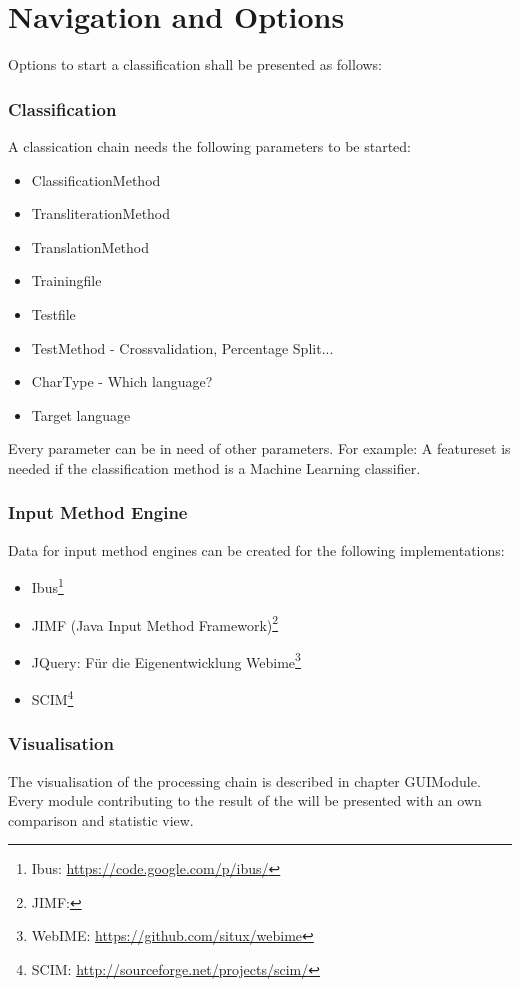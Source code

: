 \documentclass[10pt,a4paper,titlepage]{report}
\begin{document}
	\section{Navigation and Options}
	Options to start a classification shall be presented as follows:
	\subsubsection{Classification}
	A classication chain needs the following parameters to be started:
	\begin{itemize}
		\item ClassificationMethod
		\item TransliterationMethod
		\item TranslationMethod
		\item Trainingfile
		\item Testfile
		\item TestMethod - Crossvalidation, Percentage Split...
		\item CharType - Which language?
		\item Target language
	\end{itemize}
	Every parameter can be in need of other parameters. For example: A featureset is needed if the classification method is a Machine Learning classifier.
	\subsubsection{Input Method Engine}
	Data for input method engines can be created for the following implementations:
	\begin{itemize}
		\item Ibus\footnote{Ibus: \href{https://code.google.com/p/ibus/}{https://code.google.com/p/ibus/}}
		\item JIMF (Java Input Method Framework)\footnote{JIMF: }
		\item JQuery: Für die Eigenentwicklung Webime\footnote{WebIME: \href{https://github.com/situx/webime}{https://github.com/situx/webime}}
		\item SCIM\footnote{SCIM: \href{http://sourceforge.net/projects/scim/}{http://sourceforge.net/projects/scim/}}
	\end{itemize}
	\subsubsection{Visualisation}
	The visualisation of the processing chain is described in chapter GUIModule. Every module contributing to the result of the will be presented with an own comparison and statistic view.
\end{document}
